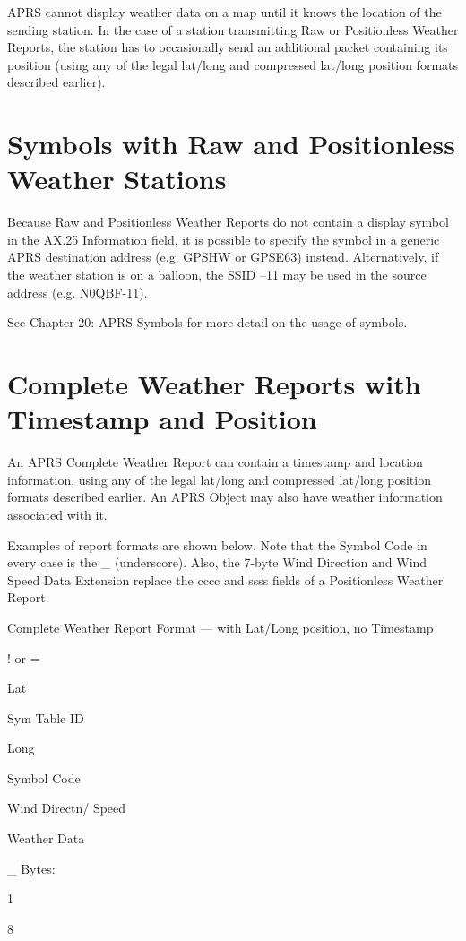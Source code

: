 APRS cannot display weather data on a map until it knows the location of the
sending station. In the case of a station transmitting Raw or Positionless
Weather Reports, the station has to occasionally send an additional packet
containing its position (using any of the legal lat/long and compressed
lat/long position formats described earlier).

\section {Symbols with Raw and Positionless Weather Stations}

Because Raw and Positionless Weather Reports do not contain a display
symbol in the AX.25 Information field, it is possible to specify the symbol in
a generic APRS destination address (e.g. GPSHW or GPSE63) instead.
Alternatively, if the weather station is on a balloon, the SSID –11 may be
used in the source address (e.g. N0QBF-11).

See Chapter 20: APRS Symbols for more detail on the usage of symbols.

\section {Complete Weather Reports with Timestamp and Position}

An APRS Complete Weather Report can contain a timestamp and location
information, using any of the legal lat/long and compressed lat/long position
formats described earlier. An APRS Object may also have weather
information associated with it.

Examples of report formats are shown below. Note that the Symbol Code in
every case is the _ (underscore). Also, the 7-byte Wind Direction and Wind
Speed Data Extension replace the cccc and ssss fields of a Positionless
Weather Report.


Complete Weather Report Format — with Lat/Long position, no Timestamp

! or
=

Lat

Sym
Table
ID

Long

Symbol
Code

Wind
Directn/
Speed

Weather
Data

_
Bytes:

1

8

